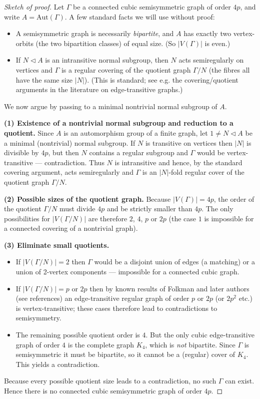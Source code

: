 \documentclass[12pt,a4paper,openany]{book}
\begin{document}
\begin{proof}[Sketch of proof]
Let $\Gamma$ be a connected cubic semisymmetric graph of order $4p$, and
write $A=\mathrm{Aut}(\Gamma)$.  A few standard facts we will use without proof:
\begin{itemize}
\item A semisymmetric graph is necessarily \emph{bipartite}, and $A$ has exactly two vertex-orbits (the two bipartition classes) of equal size.  (So $|V(\Gamma)|$ is even.)
\item If $N\lhd A$ is an intransitive normal subgroup, then $N$ acts semiregularly on vertices and $\Gamma$ is a regular covering of the quotient graph $\Gamma/N$ (the fibres all have the same size $|N|$).  (This is standard; see e.g. the covering/quotient arguments in the literature on edge-transitive graphs.)
\end{itemize}

We now argue by passing to a minimal nontrivial normal subgroup of $A$.

\medskip
\textbf{(1) Existence of a nontrivial normal subgroup and reduction to a quotient.}
Since $A$ is an automorphism group of a finite graph, let $1\neq N\lhd A$ be a minimal (nontrivial) normal subgroup. If $N$ is transitive on vertices then $|N|$ is divisible by $4p$, but then $N$ contains a regular subgroup and $\Gamma$ would be vertex-transitive — contradiction. Thus $N$ is intransitive and hence, by the standard covering argument, acts semiregularly and $\Gamma$ is an $|N|$-fold regular cover of the quotient graph $\Gamma/N$.

\medskip
\textbf{(2) Possible sizes of the quotient graph.}
Because $|V(\Gamma)|=4p$, the order of the quotient $\Gamma/N$ must divide $4p$ and be strictly smaller than $4p$. The only possibilities for $|\!V(\Gamma/N)\!|$ are therefore $2$, $4$, $p$ or $2p$ (the case $1$ is impossible for a connected covering of a nontrivial graph).  

\medskip
\textbf{(3) Eliminate small quotients.}
\begin{itemize}
\item If $|\!V(\Gamma/N)\!|=2$ then $\Gamma$ would be a disjoint union of edges (a matching) or a union of 2-vertex components — impossible for a connected cubic graph.
\item If $|\!V(\Gamma/N)\!|=p$ or $2p$ then by known results of Folkman and later authors (see references) an edge-transitive regular graph of order $p$ or $2p$ (or $2p^2$ etc.) is vertex-transitive; these cases therefore lead to contradictions to semisymmetry.
\item The remaining possible quotient order is $4$.  But the only cubic edge-transitive graph of order $4$ is the complete graph $K_4$, which is \emph{not} bipartite.  Since $\Gamma$ is semisymmetric it must be bipartite, so it cannot be a (regular) cover of $K_4$.  This yields a contradiction.
\end{itemize}

Because every possible quotient size leads to a contradiction, no such $\Gamma$ can exist. Hence there is no connected cubic semisymmetric graph of order $4p$.
\end{proof}
\end{document}
